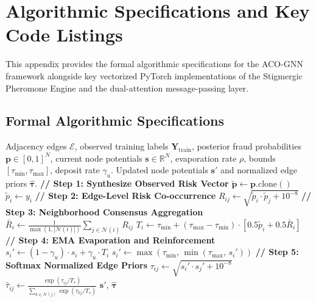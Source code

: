 \chapter{Algorithmic Specifications and Key Code Listings}
\label{app:algorithms}
\label{app:code}

This appendix provides the formal algorithmic specifications for the ACO-GNN framework alongside key vectorized PyTorch implementations of the Stigmergic Pheromone Engine and the dual-attention message-passing layer.

\section{Formal Algorithmic Specifications}

\begin{algorithm}[H]
\caption{Stigmergic Pheromone Update Cycle}
\label{alg:aco_update}
\begin{algorithmic}[1]
\Require Adjacency edges $\mathcal{E}$, observed training labels $\mathbf{Y}_{\text{train}}$, posterior fraud probabilities $\mathbf{p} \in [0, 1]^N$, current node potentials $\mathbf{s} \in \mathbb{R}^N$, evaporation rate $\rho$, bounds $[\tau_{\min}, \tau_{\max}]$, deposit rate $\gamma_u$.
\Ensure Updated node potentials $\mathbf{s}'$ and normalized edge priors $\hat{\boldsymbol{\tau}}$.
\State \textbf{// Step 1: Synthesize Observed Risk Vector}
\State $\tilde{\mathbf{p}} \leftarrow \mathbf{p}.\text{clone}()$
    \State $\tilde{p}_i \leftarrow y_i$ 
\EndFor
\State \textbf{// Step 2: Edge-Level Risk Co-occurrence}
    \State $R_{ij} \leftarrow \sqrt{\tilde{p}_i \cdot \tilde{p}_j + 10^{-8}}$ 
\EndFor
\State \textbf{// Step 3: Neighborhood Consensus Aggregation}
    \State $\bar{R}_i \leftarrow \frac{1}{\max(1, |\mathcal{N}(i)|)} \sum_{j \in \mathcal{N}(i)} R_{ij}$
    \State $T_i \leftarrow \tau_{\min} + (\tau_{\max} - \tau_{\min}) \cdot \left[0.5 \tilde{p}_i + 0.5 \bar{R}_i\right]$
    \State \textbf{// Step 4: EMA Evaporation and Reinforcement}
    \State $s_i' \leftarrow (1 - \gamma_u) \cdot s_i + \gamma_u \cdot T_i$
    \State $s_i' \leftarrow \max\left(\tau_{\min}, \, \min\left(\tau_{\max}, \, s_i'\right)\right)$
\EndFor
\State \textbf{// Step 5: Softmax Normalized Edge Priors}
    \State $\tau_{ij} \leftarrow \sqrt{s_i' \cdot s_j' + 10^{-8}}$
    \State $\hat{\tau}_{ij} \leftarrow \frac{\exp(\tau_{ij} / T_s)}{\sum_{k \in \mathcal{N}(j)} \exp(\tau_{kj} / T_s)}$
\EndFor
\State \Return $\mathbf{s}'$, $\hat{\boldsymbol{\tau}}$
\end{algorithmic}
\end{algorithm}


